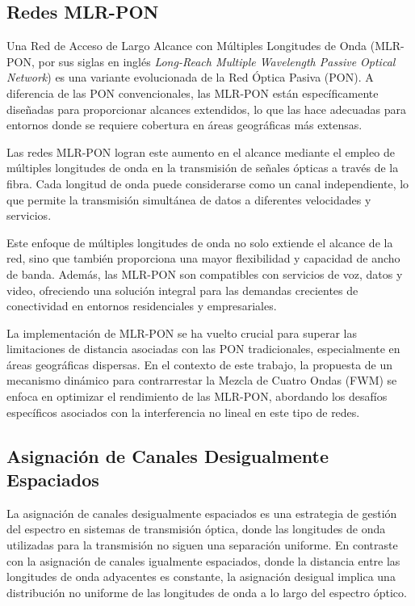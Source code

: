 \subsection{Redes MLR-PON}
Una Red de Acceso de Largo Alcance con Múltiples Longitudes de Onda (MLR-PON, por sus siglas en inglés \textit{Long-Reach Multiple Wavelength Passive Optical Network}) es una variante evolucionada de la Red Óptica Pasiva (PON). A diferencia de las PON convencionales, las MLR-PON están específicamente diseñadas para proporcionar alcances extendidos, lo que las hace adecuadas para entornos donde se requiere cobertura en áreas geográficas más extensas.

Las redes MLR-PON logran este aumento en el alcance mediante el empleo de múltiples longitudes de onda en la transmisión de señales ópticas a través de la fibra. Cada longitud de onda puede considerarse como un canal independiente, lo que permite la transmisión simultánea de datos a diferentes velocidades y servicios.

Este enfoque de múltiples longitudes de onda no solo extiende el alcance de la red, sino que también proporciona una mayor flexibilidad y capacidad de ancho de banda. Además, las MLR-PON son compatibles con servicios de voz, datos y video, ofreciendo una solución integral para las demandas crecientes de conectividad en entornos residenciales y empresariales.

La implementación de MLR-PON se ha vuelto crucial para superar las limitaciones de distancia asociadas con las PON tradicionales, especialmente en áreas geográficas dispersas. En el contexto de este trabajo, la propuesta de un mecanismo dinámico para contrarrestar la Mezcla de Cuatro Ondas (FWM) se enfoca en optimizar el rendimiento de las MLR-PON, abordando los desafíos específicos asociados con la interferencia no lineal en este tipo de redes.


\subsection{Asignación de Canales Desigualmente Espaciados}
La asignación de canales desigualmente espaciados es una estrategia de gestión del espectro en sistemas de transmisión óptica, donde las longitudes de onda utilizadas para la transmisión no siguen una separación uniforme. En contraste con la asignación de canales igualmente espaciados, donde la distancia entre las longitudes de onda adyacentes es constante, la asignación desigual implica una distribución no uniforme de las longitudes de onda a lo largo del espectro óptico.

